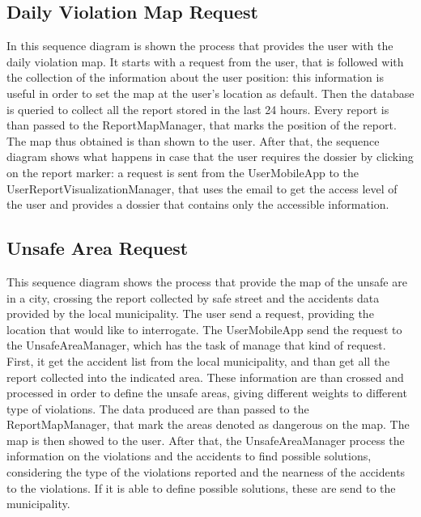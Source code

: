 \documentclass[../RASD.tex]{subfiles}
\begin{document}
    \subsection{Daily Violation Map Request}\label{subsec:daily-violation-map-request}
    \begin{figure}[H]
    \end{figure}
    In this sequence diagram is shown the process that provides the user with the daily violation map.
    It starts with a request from the user, that is followed with the collection of the information about the user position:
    this information is useful in order to set the map at the user's location as default.
    Then the database is queried to collect all the report stored in the last 24 hours.
    Every report is than passed to the ReportMapManager, that marks the position of the report.
    The map thus obtained is than shown to the user.
    After that, the sequence diagram shows what happens in case that the user requires the dossier by clicking on the report marker:
    a request is sent from the UserMobileApp to the UserReportVisualizationManager, that uses the email to get the access level of the user and provides
    a dossier that contains only the accessible information.
    \subsection{Unsafe Area Request}\label{subsec:unsafe-area-request}
    \begin{figure}[H]
    \end{figure}
    This sequence diagram shows the process that provide the map of the unsafe are in a city,
    crossing the report collected by safe street and the accidents data provided by the local municipality.
    The user send a request, providing the location that would like to interrogate.
    The UserMobileApp send the request to the UnsafeAreaManager, which has the task of manage that kind of request.
    First, it get the accident list from the local municipality, and than get all the report collected into the indicated area.
    These information are than crossed and processed in order to define the unsafe areas, giving different weights to different type of violations.
    The data produced are than passed to the ReportMapManager, that mark the areas denoted as dangerous on the map.
    The map is then showed to the user.
    After that, the UnsafeAreaManager process the information on the violations and the accidents to find possible solutions,
    considering the type of the violations reported and the nearness of the accidents to the violations.
    If it is able to define possible solutions, these are send to the municipality.
\end{document}
